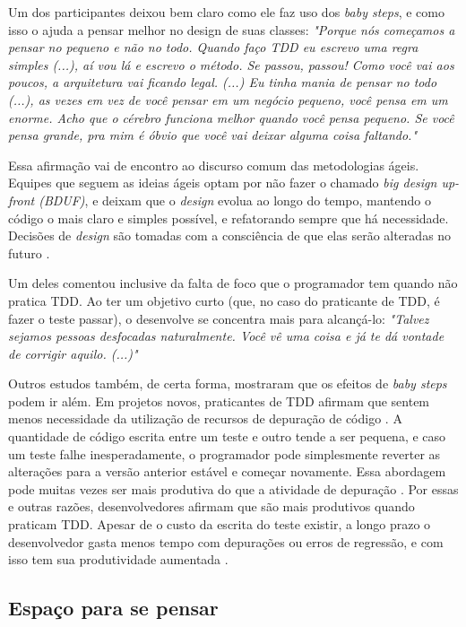 Um dos participantes deixou bem claro como ele faz uso dos \textit{baby steps}, e como
isso o ajuda a pensar melhor no design de suas classes:
\textit{"Porque nós começamos a pensar no pequeno e não no todo. Quando faço TDD eu escrevo
uma regra simples (...), aí vou lá e escrevo o método. Se passou, passou! Como você vai aos poucos,
a arquitetura vai ficando legal. (...) Eu tinha mania de pensar no todo (...), as vezes
em vez de você pensar em um negócio pequeno, você pensa em um enorme. Acho que o cérebro funciona
melhor quando você pensa pequeno. Se você pensa grande, pra mim é óbvio que você vai deixar
alguma coisa faltando."}

Essa afirmação vai de encontro ao discurso comum das metodologias ágeis.
Equipes que seguem as ideias ágeis optam por não fazer o chamado \textit{big design up-front (BDUF)},
e deixam que o \textit{design} evolua ao longo do tempo, mantendo o código o mais claro e
simples possível, e refatorando sempre que há necessidade. Decisões de
\textit{design} são tomadas com a consciência de que elas serão alteradas no futuro
\cite{is-design-dead}.

Um deles comentou inclusive da falta de foco que o programador tem quando não pratica TDD.
Ao ter um objetivo curto (que, no caso do praticante de TDD, é fazer o teste passar), o
desenvolve se concentra mais para alcançá-lo:
\textit{"Talvez sejamos pessoas desfocadas naturalmente. Você vê uma coisa e já te dá vontade
de corrigir aquilo. (...)"}

Outros estudos também, de certa forma, mostraram que os efeitos de \textit{baby steps}
podem ir além.
Em projetos novos, praticantes de TDD afirmam que sentem menos necessidade da
utilização de recursos de depuração de código \cite{george-williams-experiment} 
\cite{janzen-arch-improvement}. 
A quantidade de código
escrita entre um teste e outro tende a ser pequena, e caso um teste falhe
inesperadamente, o programador pode simplesmente reverter as alterações para a 
versão anterior estável e começar novamente. Essa abordagem pode muitas vezes
ser mais produtiva do que a atividade de depuração 
\cite{janzen-arch-improvement}. Por essas e outras razões, desenvolvedores afirmam 
que são mais produtivos quando praticam TDD. Apesar de o custo da escrita do teste
existir, a longo prazo o desenvolvedor gasta menos tempo com depurações ou 
erros de regressão, e com isso tem sua produtividade aumentada
\cite{george-e-williams}.

\subsection{Espaço para se pensar}

